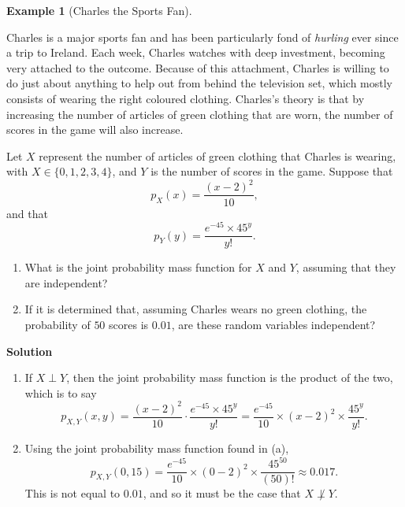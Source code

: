 \documentclass[
  letterpaper,
  DIV=11,
  numbers=noendperiod]{scrreprt}
\providecommand{\tightlist}{%
  \setlength{\itemsep}{0pt}\setlength{\parskip}{0pt}}\usepackage{longtable,booktabs,array}
\theoremstyle{definition}
\theoremstyle{definition}
\newtheorem{example}{Example}[chapter]
\theoremstyle{definition}
\theoremstyle{remark}
\begin{document}
\begin{example}[Charles the Sports
Fan]\protect\hypertarget{exm-pmf-independence}{}\label{exm-pmf-independence}

Charles is a major sports fan and has been particularly fond of
\emph{hurling} ever since a trip to Ireland. Each week, Charles watches
with deep investment, becoming very attached to the outcome. Because of
this attachment, Charles is willing to do just about anything to help
out from behind the television set, which mostly consists of wearing the
right coloured clothing. Charles's theory is that by increasing the
number of articles of green clothing that are worn, the number of scores
in the game will also increase.

Let \(X\) represent the number of articles of green clothing that
Charles is wearing, with \(X \in \{0,1,2,3,4\}\), and \(Y\) is the
number of scores in the game. Suppose that
\[p_X(x) = \frac{(x-2)^2}{10},\] and that
\[p_Y(y) = \frac{e^{-45}\times 45^y}{y!}.\]

\begin{enumerate}
\def\labelenumi{\alph{enumi}.}
\tightlist
\item
  What is the joint probability mass function for \(X\) and \(Y\),
  assuming that they are independent?
\item
  If it is determined that, assuming Charles wears no green clothing,
  the probability of \(50\) scores is \(0.01\), are these random
  variables independent?
\end{enumerate}

\begin{tcolorbox}[enhanced jigsaw, colback=white, colframe=quarto-callout-color-frame, arc=.35mm, leftrule=.75mm, rightrule=.15mm, opacityback=0, breakable, bottomrule=.15mm, left=2mm, toprule=.15mm]

\vspace{-3mm}\textbf{Solution}\vspace{3mm}

\begin{enumerate}
\def\labelenumi{\alph{enumi}.}
\item
  If \(X\perp Y\), then the joint probability mass function is the
  product of the two, which is to say
  \[p_{X,Y}(x,y) = \frac{(x-2)^2}{10}\cdot\frac{e^{-45}\times 45^y}{y!} = \frac{e^{-45}}{10}\times (x-2)^2 \times \frac{45^y}{y!}.\]
\item
  Using the joint probability mass function found in (a),
  \[p_{X,Y}(0, 15) = \frac{e^{-45}}{10}\times (0-2)^2 \times \frac{45^{50}}{(50)!} \approx 0.017.\]
  This is not equal to \(0.01\), and so it must be the case that
  \(X\not\perp Y\).
\end{enumerate}

\end{tcolorbox}

\end{example}
\end{document}
